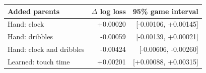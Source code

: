 \begin{tabular}{lrr}
\toprule
Added parents & $\Delta$ log loss & 95\% game interval\\
\midrule
Hand: clock & +0.00020 & [-0.00106, +0.00145]\\
Hand: dribbles & -0.00059 & [-0.00139, +0.00021]\\
Hand: clock and dribbles & -0.00424 & [-0.00606, -0.00260]\\
Learned: touch time & +0.00201 & [+0.00088, +0.00315]\\
\bottomrule
\end{tabular}
